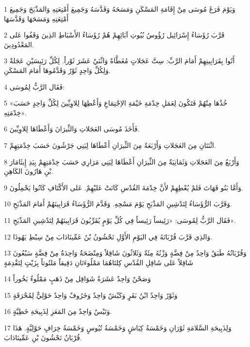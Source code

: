 \par 1 وَيَوْمَ فَرَغَ مُوسَى مِنْ إِقَامَةِ المَسْكَنِ وَمَسَحَهُ وَقَدَّسَهُ وَجَمِيعَ أَمْتِعَتِهِ وَالمَذْبَحَ وَجَمِيعَ أَمْتِعَتِهِ وَمَسَحَهَا وَقَدَّسَهَا
\par 2 قَرَّبَ رُؤَسَاءُ إِسْرَائِيل رُؤُوسُ بُيُوتِ آبَائِهِمْ هُمْ رُؤَسَاءُ الأَسْبَاطِ الذِينَ وَقَفُوا عَلى المَعْدُودِينَ.
\par 3 أَتُوا بِقَرَابِينِهِمْ أَمَامَ الرَّبِّ: سِتَّ عَجَلاتٍ مُغَطَّاةً وَاثْنَيْ عَشَرَ ثَوْراً. لِكُلِّ رَئِيسَيْنِ عَجَلةٌ وَلِكُلِّ وَاحِدٍ ثَوْرٌ وَقَدَّمُوهَا أَمَامَ المَسْكَنِ.
\par 4 فَقَال الرَّبُّ لِمُوسَى:
\par 5 «خُذْهَا مِنْهُمْ فَتَكُونَ لِعَمَلِ خِدْمَةِ خَيْمَةِ الاِجْتِمَاعِ وَأَعْطِهَا لِلاوِيِّينَ لِكُلِّ وَاحِدٍ حَسَبَ خِدْمَتِهِ».
\par 6 فَأَخَذَ مُوسَى العَجَلاتِ وَالثِّيرَانَ وَأَعْطَاهَا لِلاوِيِّينَ.
\par 7 اثْنَتَانِ مِنَ العَجَلاتِ وَأَرْبَعَةٌ مِنَ الثِّيرَانِ أَعْطَاهَا لِبَنِي جَرْشُونَ حَسَبَ خِدْمَتِهِمْ.
\par 8 وَأَرْبَعٌ مِنَ العَجَلاتِ وَثَمَانِيَةٌ مِنَ الثِّيرَانِ أَعْطَاهَا لِبَنِي مَرَارِي حَسَبَ خِدْمَتِهِمْ بِيَدِ إِيثَامَارَ بْنِ هَارُونَ الكَاهِنِ.
\par 9 وَأَمَّا بَنُو قَهَاتَ فَلمْ يُعْطِهِمْ لأَنَّ خِدْمَةَ القُدْسِ كَانَتْ عَليْهِمْ. عَلى الأَكْتَافِ كَانُوا يَحْمِلُونَ.
\par 10 وَقَرَّبَ الرُّؤَسَاءُ لِتَدْشِينِ المَذْبَحِ يَوْمَ مَسْحِهِ. وَقَدَّمَ الرُّؤَسَاءُ قَرَابِينَهُمْ أَمَامَ المَذْبَحِ.
\par 11 فَقَال الرَّبُّ لِمُوسَى: «رَئِيساً رَئِيساً فِي كُلِّ يَوْمٍ يُقَرِّبُونَ قَرَابِينَهُمْ لِتَدْشِينِ المَذْبَحِ».
\par 12 وَالذِي قَرَّبَ قُرْبَانَهُ فِي اليَوْمِ الأَوَّلِ نَحْشُونُ بْنُ عَمِّينَادَابَ مِنْ سِبْطِ يَهُوذَا.
\par 13 وَقُرْبَانُهُ طَبَقٌ وَاحِدٌ مِنْ فِضَّةٍ وَزْنُهُ مِئَةٌ وَثَلاثُونَ شَاقِلاً وَمِنْضَحَةٌ وَاحِدَةٌ مِنْ فِضَّةٍ سَبْعُونَ شَاقِلاً عَلى شَاقِلِ القُدْسِ كِلتَاهُمَا مَمْلُوءَتَانِ دَقِيقاً مَلتُوتاً بِزَيْتٍ لِتَقْدِمَةٍ
\par 14 وَصَحْنٌ وَاحِدٌ عَشَرَةُ شَوَاقِل مِنْ ذَهَبٍ مَمْلُوءٌ بَخُوراً
\par 15 وَثَوْرٌ وَاحِدٌ ابْنُ بَقَرٍ وَكَبْشٌ وَاحِدٌ وَخَرُوفٌ وَاحِدٌ حَوْلِيٌّ لِمُحْرَقَةٍ
\par 16 وَتَيْسٌ وَاحِدٌ مِنَ المَعَزِ لِذَبِيحَةِ خَطِيَّةٍ.
\par 17 وَلِذَبِيحَةِ السَّلامَةِ ثَوْرَانِ وَخَمْسَةُ كِبَاشٍ وَخَمْسَةُ تُيُوسٍ وَخَمْسَةُ خِرَافٍ حَوْلِيَّةٍ. هَذَا قُرْبَانُ نَحْشُونَ بْنِ عَمِّينَادَابَ.
